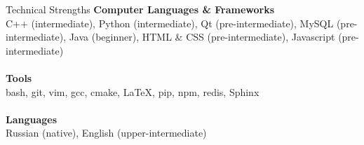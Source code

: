\documentclass{resume} %
\begin{document}

\begin{rSection}{Technical Strengths}
{\bf Computer Languages \& Frameworks}\\ 
C++ (intermediate), Python (intermediate), Qt (pre-intermediate), MySQL (pre-intermediate), 
Java (beginner), HTML \& CSS (pre-intermediate), Javascript (pre-intermediate) \\ \\
{\bf Tools} \\ 
bash, git, vim, gcc, cmake, LaTeX, pip, npm, redis, Sphinx \\ \\
{\bf Languages} \\ 
Russian (native), English (upper-intermediate)
\end{rSection}





\end{document}
